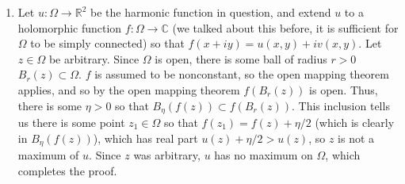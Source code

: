 \documentclass[12pt]{article}
\theoremstyle{definitionstyle}
\def\mbb#1{\mathbb{#1}}
\def \C{\mbb{C}}
\def \R{\mbb{R}}
\begin{document}
\begin{enumerate}[leftmargin=\labelsep]
		It cannot be that $f$ is holomorphic at $\alpha_1$ since $f$ is unbounded in a neighborhood of $\alpha_1$, a contradiction. We could've done this argument with any of the factors, so it follows that $(z-\alpha_i)^{m_i} \mid p_i(z)$ for all $1 \leq i \leq n$. But then $f(z)$ is just a polynomial. If $\deg(f) \geq 2$, then $f$ cannot be injective since we have two cases, either $f(z) = (z-\alpha)^m$ where $m \geq 2$, or $f$ has at least two distinct roots. In the ladder case $f$ already isn't injective, and in the first case we could consider $f(z) - 1 = 0$ and see that this has $m$ distinct solutions, so $f(z)$ is again not injective. So, $f(z) = az + b$. We already showed that $f$ cannot be constant, so it follows that $a \neq 0$, completing the proof. $\hfill$ \textbf{Q.E.D.}
		
		\item Let $u: \Omega \to \R^2$ be the harmonic function in question, and extend $u$ to a holomorphic function $f: \Omega \to \C$ (we talked about this before, it is sufficient for $\Omega$ to be simply connected) so that $f(x+iy) = u(x, y) + iv(x,y)$. Let $z \in \Omega$ be arbitrary. Since $\Omega$ is open, there is some ball of radius $r > 0$ $B_r(z) \subset \Omega$. $f$ is assumed to be nonconstant, so the open mapping theorem applies, and so by the open mapping theorem $f(B_r(z))$ is open. Thus, there is some $\eta > 0$ so that $B_\eta(f(z)) \subset f(B_r(z))$. This inclusion tells us there is some point $z_1 \in \Omega$ so that $f(z_1) = f(z) + \eta/2$ (which is clearly in $B_\eta(f(z))$), which has real part $u(z) + \eta/2 > u(z)$, so $z$ is not a maximum of $u$. Since $z$ was arbitrary, $u$ has no maximum on $\Omega$, which completes the proof.
		

\end{enumerate}
\end{document}
